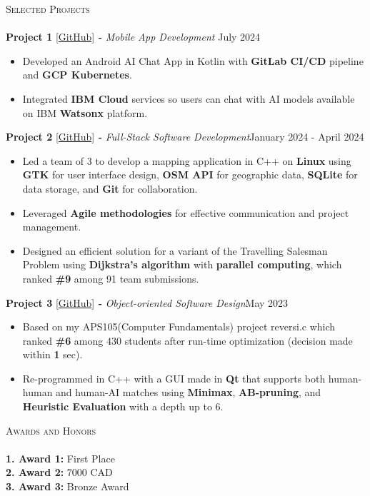 \documentclass[a4paper]{article}
\newcommand{\lineunder} {
    \vspace*{-8pt} \\
    \hspace*{-18pt} \hrulefill \hspace*{-0.5cm} \\
}
\newcommand{\header} [1] {
    {\hspace*{-18pt}\vspace*{6pt} \textsc{#1}}
    \vspace*{-6pt} \lineunder
}
\begin{document}
\vspace*{2mm}
\header{Selected Projects}
{\textbf{Project 1}} {[\href{https://www.google.com}{GitHub}]} {\sl \textbf{-} Mobile App Development }\hfill July 2024\\
\vspace{-1mm}
\begin{itemize}
    \item  Developed an Android AI Chat App in Kotlin with \textbf{GitLab CI/CD} pipeline and \textbf{GCP Kubernetes}.
    \item Integrated \textbf{IBM Cloud} services so users can chat with AI models available on IBM \textbf{Watsonx} platform.
\end{itemize}
\vspace{2mm}
{\textbf{Project 2}} {[\href{https://www.google.com}{GitHub}]} {\sl \textbf{-} Full-Stack Software Development}\hfill January 2024 - April 2024\\
\vspace{-1mm}
\begin{itemize}
    \item Led a team of 3 to develop a mapping application in C++ on \textbf{Linux} using \textbf{GTK} for user interface design, \textbf{OSM API} for geographic data, \textbf{SQLite} for data storage, and \textbf{Git} for collaboration.
    \item Leveraged \textbf{Agile methodologies} for effective communication and project management.
    \item Designed an efficient solution for a variant of the Travelling Salesman Problem using \textbf{Dijkstra's algorithm} with \textbf{parallel computing}, which ranked \textbf{\#9} among 91 team submissions.
\end{itemize}
\vspace*{2mm}
{\textbf{Project 3}} {[\href{https://www.google.com}{GitHub}]} {\sl \textbf{-} Object-oriented Software Design}\hfill May 2023\\
\vspace{-1mm}
\begin{itemize}
    \item Based on my APS105(Computer Fundamentals) project reversi.c which ranked \textbf{\#6} among 430 students after run-time optimization (decision made within \textbf{1} sec).
    \item Re-programmed in C++ with a GUI made in \textbf{Qt} that supports both human-human and human-AI matches using \textbf{Minimax}, \textbf{AB-pruning}, and \textbf{Heuristic Evaluation} with a depth up to 6.
\end{itemize}
\vspace*{2mm}

\header{Awards and Honors}
\textbf{1. Award 1:} {First Place}\\
\vspace*{2mm}
\textbf{2. Award 2:} {7000 CAD}\\
\vspace*{2mm}
\textbf{3. Award 3:} {Bronze Award}\
\end{document}
